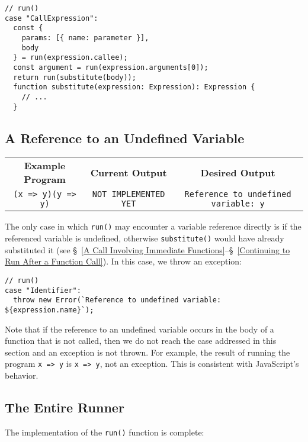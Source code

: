\documentclass[12pt, oneside]{book}
\begin{document}
\begin{verbatim}
// run()
case "CallExpression":
  const {
    params: [{ name: parameter }],
    body
  } = run(expression.callee);
  const argument = run(expression.arguments[0]);
  return run(substitute(body));
  function substitute(expression: Expression): Expression {
    // ...
  }
\end{verbatim}

\subsection{A Reference to an Undefined Variable}

\begin{center}
\begin{tabular}{c|c|c}
\textbf{Example Program} & \textbf{Current Output} & \textbf{Desired Output} \\
\texttt{(x => y)(y => y)} & \texttt{NOT IMPLEMENTED YET} & \texttt{Reference to undefined variable: y} \\
\end{tabular}
\end{center}

\noindent The only case in which \texttt{run()} may encounter a variable reference directly is if the referenced variable is undefined, otherwise \texttt{substitute()} would have already substituted it (see §~\ref{A Call Involving Immediate Functions}–§~\ref{Continuing to Run After a Function Call}). In this case, we throw an exception:

\begin{verbatim}
// run()
case "Identifier":
  throw new Error(`Reference to undefined variable: ${expression.name}`);
\end{verbatim}

Note that if the reference to an undefined variable occurs in the body of a function that is not called, then we do not reach the case addressed in this section and an exception is not thrown. For example, the result of running the program \texttt{x => y} is \texttt{x => y}, not an exception. This is consistent with JavaScript’s behavior.

\subsection{The Entire Runner}
\label{The Entire Runner}

The implementation of the \texttt{run()} function is complete:
\end{document}
